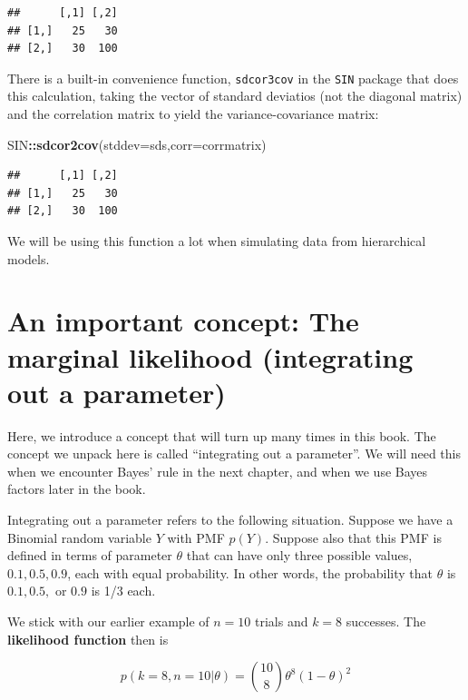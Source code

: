 \documentclass[12pt,]{krantz}
\newenvironment{Shaded}{\begin{snugshade}}{\end{snugshade}}
\newcommand{\KeywordTok}[1]{\textcolor[rgb]{0.13,0.29,0.53}{\textbf{#1}}}
\newcommand{\DataTypeTok}[1]{\textcolor[rgb]{0.13,0.29,0.53}{#1}}
\newcommand{\OperatorTok}[1]{\textcolor[rgb]{0.81,0.36,0.00}{\textbf{#1}}}
\newcommand{\NormalTok}[1]{#1}
\theoremstyle{definition}
\theoremstyle{definition}
\theoremstyle{definition}
\theoremstyle{remark}
\begin{document}
\begin{verbatim}
##      [,1] [,2]
## [1,]   25   30
## [2,]   30  100
\end{verbatim}

There is a built-in convenience function, \texttt{sdcor3cov} in the
\texttt{SIN} package that does this calculation, taking the vector of
standard deviatios (not the diagonal matrix) and the correlation matrix
to yield the variance-covariance matrix:

\begin{Shaded}
\begin{Highlighting}[]
\NormalTok{SIN}\OperatorTok{::}\KeywordTok{sdcor2cov}\NormalTok{(}\DataTypeTok{stddev=}\NormalTok{sds,}\DataTypeTok{corr=}\NormalTok{corrmatrix)}
\end{Highlighting}
\end{Shaded}

\begin{verbatim}
##      [,1] [,2]
## [1,]   25   30
## [2,]   30  100
\end{verbatim}

We will be using this function a lot when simulating data from
hierarchical models.

\section{An important concept: The marginal likelihood (integrating out
a parameter)}\label{sec:marginal}

Here, we introduce a concept that will turn up many times in this book.
The concept we unpack here is called ``integrating out a parameter''. We
will need this when we encounter Bayes' rule in the next chapter, and
when we use Bayes factors later in the book.

Integrating out a parameter refers to the following situation. Suppose
we have a Binomial random variable \(Y\) with PMF \(p(Y)\). Suppose also
that this PMF is defined in terms of parameter \(\theta\) that can have
only three possible values, \(0.1, 0.5, 0.9\), each with equal
probability. In other words, the probability that \(\theta\) is
\(0.1, 0.5,\) or \(0.9\) is 1/3 each.

We stick with our earlier example of \(n=10\) trials and \(k=8\)
successes. The \textbf{likelihood function} then is

\begin{equation}
p(k=8,n=10|\theta) = \binom{10}{8} \theta^8 (1-\theta)^{2}
\end{equation}
\end{document}
